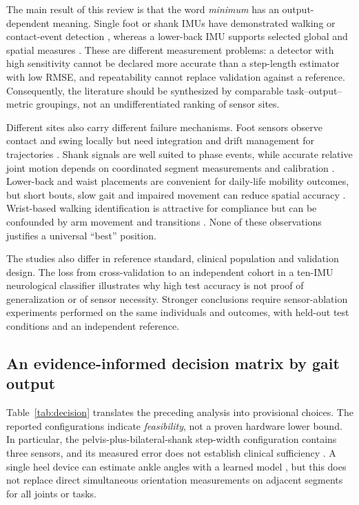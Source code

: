 \documentclass[10pt,a4paper,twocolumn]{article}
\begin{document}
The main result of this review is that the word \emph{minimum} has an output-dependent meaning. Single foot or shank IMUs have demonstrated walking or contact-event detection \citep{prigent2023,romijnders2022}, whereas a lower-back IMU supports selected global and spatial measures \citep{mico2023,zadka2024}. These are different measurement problems: a detector with high sensitivity cannot be declared more accurate than a step-length estimator with low RMSE, and repeatability cannot replace validation against a reference. Consequently, the literature should be synthesized by comparable task--output--metric groupings, not an undifferentiated ranking of sensor sites.

Different sites also carry different failure mechanisms. Foot sensors observe contact and swing locally but need integration and drift management for trajectories \citep{guimaraes2021}. Shank signals are well suited to phase events, while accurate relative joint motion depends on coordinated segment measurements and calibration \citep{salminen2024,niswander2020}. Lower-back and waist placements are convenient for daily-life mobility outcomes, but short bouts, slow gait and impaired movement can reduce spatial accuracy \citep{mico2023}. Wrist-based walking identification is attractive for compliance but can be confounded by arm movement and transitions \citep{kluge2024,anderson2025}. None of these observations justifies a universal ``best'' position.

The studies also differ in reference standard, clinical population and validation design. The loss from cross-validation to an independent cohort in a ten-IMU neurological classifier \citep{lin2023} illustrates why high test accuracy is not proof of generalization or of sensor necessity. Stronger conclusions require sensor-ablation experiments performed on the same individuals and outcomes, with held-out test conditions and an independent reference.

\subsection{An evidence-informed decision matrix by gait output}
\label{sec:decision}

Table~\ref{tab:decision} translates the preceding analysis into provisional choices. The reported configurations indicate \emph{feasibility}, not a proven hardware lower bound. In particular, the pelvis-plus-bilateral-shank step-width configuration contains three sensors, and its measured error does not establish clinical sufficiency \citep{wang2025h}. A single heel device can estimate ankle angles with a learned model \citep{wang2025l}, but this does not replace direct simultaneous orientation measurements on adjacent segments for all joints or tasks.
\end{document}
